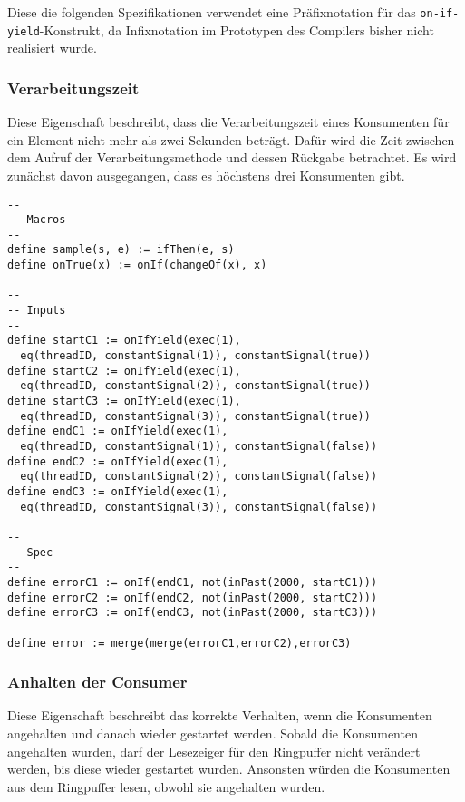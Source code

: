 \documentclass{article}
\begin{document}
Diese die folgenden Spezifikationen verwendet eine Präfixnotation für das \texttt{on-if-yield}-Konstrukt, da Infixnotation im Prototypen des Compilers bisher nicht realisiert wurde.

\subsubsection{Verarbeitungszeit}

Diese Eigenschaft beschreibt, dass die Verarbeitungszeit eines Konsumenten für ein Element nicht mehr als zwei Sekunden beträgt.
Dafür wird die Zeit zwischen dem Aufruf der Verarbeitungsmethode und dessen Rückgabe betrachtet. Es wird zunächst davon ausgegangen, dass es höchstens drei Konsumenten gibt.

\begin{lstlisting}[language=tessla+salt]
--
-- Macros
--
define sample(s, e) := ifThen(e, s)
define onTrue(x) := onIf(changeOf(x), x)

--
-- Inputs
--
define startC1 := onIfYield(exec(1),
  eq(threadID, constantSignal(1)), constantSignal(true))
define startC2 := onIfYield(exec(1),
  eq(threadID, constantSignal(2)), constantSignal(true))
define startC3 := onIfYield(exec(1),
  eq(threadID, constantSignal(3)), constantSignal(true))
define endC1 := onIfYield(exec(1),
  eq(threadID, constantSignal(1)), constantSignal(false))
define endC2 := onIfYield(exec(1),
  eq(threadID, constantSignal(2)), constantSignal(false))
define endC3 := onIfYield(exec(1),
  eq(threadID, constantSignal(3)), constantSignal(false))

--
-- Spec
--
define errorC1 := onIf(endC1, not(inPast(2000, startC1)))
define errorC2 := onIf(endC2, not(inPast(2000, startC2)))
define errorC3 := onIf(endC3, not(inPast(2000, startC3)))

define error := merge(merge(errorC1,errorC2),errorC3)
\end{lstlisting}

\subsubsection{Anhalten der Consumer}

Diese Eigenschaft beschreibt das korrekte Verhalten, wenn die Konsumenten angehalten und danach wieder gestartet werden.
Sobald die Konsumenten angehalten wurden, darf der Lesezeiger für den Ringpuffer nicht verändert werden, bis diese wieder gestartet wurden. Ansonsten würden die Konsumenten aus dem Ringpuffer lesen, obwohl sie angehalten wurden.
\end{document}
